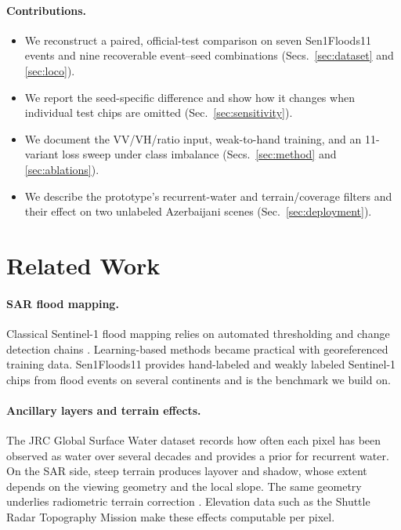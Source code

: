 \paragraph{Contributions.}
\begin{itemize}
\item We reconstruct a paired, official-test comparison on seven
Sen1Floods11 events and nine recoverable event--seed combinations
(Secs.~\ref{sec:dataset} and \ref{sec:loco}).
\item We report the seed-specific difference and show how it changes
when individual test chips are omitted (Sec.~\ref{sec:sensitivity}).
\item We document the VV/VH/ratio input, weak-to-hand training, and an
11-variant loss sweep under class imbalance
(Secs.~\ref{sec:method} and \ref{sec:ablations}).
\item We describe the prototype's recurrent-water and terrain/coverage
filters and their effect on two unlabeled Azerbaijani scenes
(Sec.~\ref{sec:deployment}).
\end{itemize}

\section{Related Work}
\label{sec:related}

\paragraph{SAR flood mapping.}
Classical Sentinel-1 flood mapping relies on automated thresholding and
change detection chains \cite{twele2016sentinel1}. Learning-based methods
became practical with georeferenced training data. Sen1Floods11
\cite{bonafilia2020} provides hand-labeled and weakly labeled Sentinel-1
chips from flood events on several continents and is the benchmark we
build on.

\paragraph{Ancillary layers and terrain effects.}
The JRC Global Surface Water dataset \cite{pekel2016high} records how often
each pixel has been observed as water over several decades and provides a
prior for recurrent water. On the SAR side, steep terrain produces layover
and shadow, whose extent depends on the viewing geometry and the local
slope. The same geometry underlies radiometric terrain correction
\cite{small2011}. Elevation data such as the Shuttle Radar Topography
Mission \cite{farr2007} make these effects computable per pixel.

